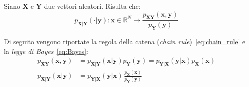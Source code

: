 \begin{Mybox}
    \begin{definizione}Siano $\mathbf{X}$ e $\mathbf{Y}$ due vettori aleatori. Risulta che:
        \begin{equation}
         p_{\mathbf{X}| \mathbf{Y}}(\cdot |\mathbf{y})\colon \mathbf{x}\in\mathbb{R}^N \longrightarrow \frac{p_{\mathbf{XY}}(\mathbf{x},\mathbf{y})}{p_{\mathbf{Y}}(\mathbf{y})}
        \end{equation}
    \end{definizione}  
\end{Mybox}
\noindent Di seguito vengono riportate la regola della catena (\emph{chain rule})~\eqref{eq:chain_rule} e la 
\emph{legge di Bayes}~\eqref{eq:Bayes}:
\begin{align}
    p_{\mathbf{X}\mathbf{Y}}(\mathbf{x},\mathbf{y})&=p_{\mathbf{X}| \mathbf{Y}}(\mathbf{x} |\mathbf{y})p_{\mathbf{Y}}(\mathbf{y})=p_{\mathbf{Y}| \mathbf{X}}(\mathbf{y}|\mathbf{x})p_{\mathbf{X}}(\mathbf{x})\label{eq:chain_rule}\\
    p_{\mathbf{X}| \mathbf{Y}}(\mathbf{x} |\mathbf{y})&=p_{\mathbf{Y}| \mathbf{X}}(\mathbf{y}|\mathbf{x})\,\frac{p_{\mathbf{X}}(\mathbf{x})}{p_{\mathbf{Y}}(\mathbf{y})}\label{eq:Bayes}
\end{align}

